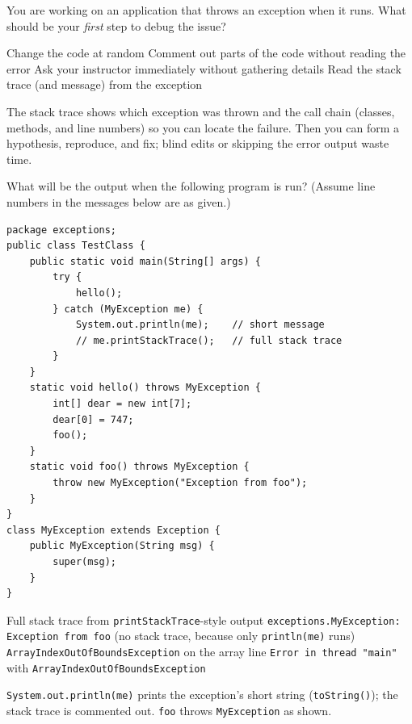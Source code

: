 \newpage

\question[4]
You are working on an application that throws an exception when it runs. What should be your \emph{first} step to debug the issue?
\begin{choices}
  \choice Change the code at random
  \choice Comment out parts of the code without reading the error
  \choice Ask your instructor immediately without gathering details
  \CorrectChoice Read the stack trace (and message) from the exception
\end{choices}
\begin{solution}
  The stack trace shows which exception was thrown and the call chain (classes, methods, and line numbers) so you can locate the failure. Then you can form a hypothesis, reproduce, and fix; blind edits or skipping the error output waste time.
\end{solution}

\question[4]
What will be the output when the following program is run? (Assume line numbers in the messages below are as given.)
\begin{lstlisting}[style=java]
package exceptions;
public class TestClass {
    public static void main(String[] args) {
        try {
            hello();
        } catch (MyException me) {
            System.out.println(me);    // short message
            // me.printStackTrace();   // full stack trace
        }
    }
    static void hello() throws MyException {
        int[] dear = new int[7];
        dear[0] = 747;
        foo();
    }
    static void foo() throws MyException {
        throw new MyException("Exception from foo");
    }
}
class MyException extends Exception {
    public MyException(String msg) {
        super(msg);
    }
}
\end{lstlisting}
\begin{choices}
  \choice Full stack trace from \texttt{printStackTrace}-style output
  \CorrectChoice \texttt{exceptions.MyException: Exception from foo} (no stack trace, because only \texttt{println(me)} runs)
  \choice \texttt{ArrayIndexOutOfBoundsException} on the array line
  \choice \texttt{Error in thread "main"} with \texttt{ArrayIndexOutOfBoundsException}
\end{choices}
\begin{solution}
  \texttt{System.out.println(me)} prints the exception's short string (\texttt{toString()}); the stack trace is commented out. \texttt{foo} throws \texttt{MyException} as shown.
\end{solution}

